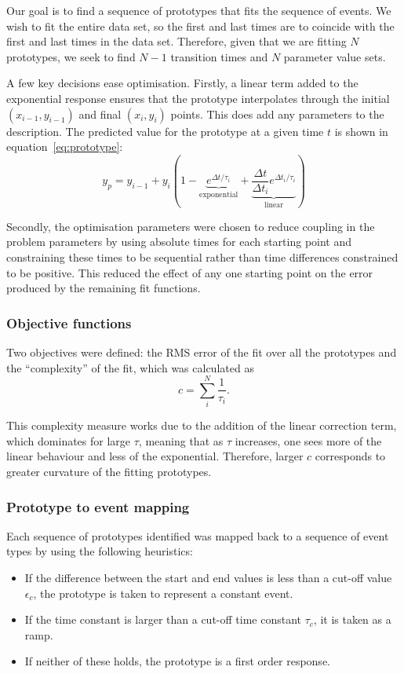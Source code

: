 Our goal is to find a sequence of prototypes that fits the sequence of
events.  We wish to fit the entire data set, so the first and last
times are to coincide with the first and last times in the data set.
Therefore, given that we are fitting $N$ prototypes, we seek to find
$N-1$ transition times and $N$ parameter value sets.

A few key decisions ease optimisation.  Firstly, a linear term 
added to the exponential response ensures that the prototype
interpolates through the initial $(x_{i-1}, y_{i-1})$ and final
$(x_{i}, y_{i})$ points.  This does add any parameters to the
description.  The predicted value for the prototype at a given time
$t$ is shown in equation~\ref{eq:prototype}:
\begin{equation}
  \label{eq:prototype}
  y_p = y_{i-1} + y_i \left (1 - \underbrace{e^{\Delta
        t/\tau_i}}_{\textrm{exponential}} + \underbrace{\frac{\Delta
        t}{\Delta t_i}e^{\Delta t_i/\tau_i}}_{\textrm{linear}} \right)
\end{equation}

Secondly, the optimisation parameters were chosen to reduce coupling
in the problem parameters by using absolute times for each starting
point and constraining these times to be sequential rather than time
differences constrained to be positive.  This reduced the effect of
any one starting point on the error produced by the remaining fit
functions.

\subsubsection{Objective functions}
Two objectives were defined: the RMS error of the fit over all the
prototypes and the ``complexity'' of the fit, which was calculated as
\begin{equation}
  c = \sum_i^{N} \frac{1}{\tau_i}.
\end{equation}

This complexity measure works due to the addition of the linear
correction term, which dominates for large $\tau$, meaning that as
$\tau$ increases, one sees more of the linear behaviour and less of
the exponential.  Therefore, larger $c$ corresponds to greater
curvature of the fitting prototypes.

\subsubsection{Prototype to event mapping}
Each sequence of prototypes identified was mapped back to a sequence
of event types by using the following heuristics:
\begin{itemize}
\item If the difference between the start and end values is less
  than a cut-off value $\epsilon_c$, the prototype is taken to
  represent a constant event.
\item If the time constant is larger than a cut-off time constant
  $\tau_c$, it is taken as a ramp.
\item If neither of these holds, the prototype is a first order response.
\end{itemize}

